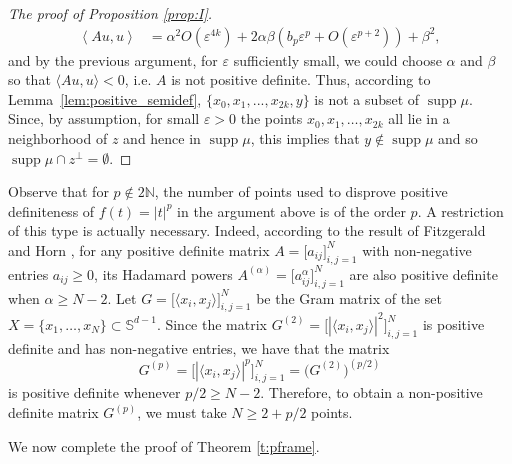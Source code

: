 \documentclass[11pt, leqno]{amsart}
\def\N{\mathbb N}
\theoremstyle{definition}
\numberwithin{equation}{section}
\begin{document}
\begin{proof}[The proof of Proposition \ref{prop:I}]
\begin{equation*}
\begin{aligned}
\left\langle   Au, u  \right\rangle & = \alpha^2 O(\varepsilon^{4k}) + 2 \alpha \beta \left( b_p \varepsilon^p + O( \varepsilon^{p + 2}) \right) + \beta^2,
\end{aligned}
\end{equation*}
and by the previous argument, for $\varepsilon$ sufficiently small, we could choose $\alpha$ and $\beta$ so that $\langle Au, u \rangle < 0$, i.e. $A$ is not positive definite. Thus, according to Lemma~\ref{lem:positive_semidef},  $\{ x_0, x_1, ..., x_{2k}, y \}$ is not a subset of $ \operatorname{supp} \mu$. Since, by assumption, for small $\varepsilon >0$  the points $x_0, x_1, \dots , x_{2k}$ all lie in a neighborhood of $z$ and hence in $\operatorname{supp} \mu$, this implies that $y \not\in \operatorname{supp} \mu $ and so  $\operatorname{supp} \mu  \cap  z^\perp  = \emptyset$. \end{proof}

Observe that for   $p\not\in 2 \N$, the number of points used to disprove positive definiteness of $f(t) = |t|^p$ in the  argument above is of the order $p$. A restriction of this type is actually  necessary.  Indeed, according to the result of Fitzgerald and Horn \cite{fitzgeraldFract1977}, for any positive definite matrix $A = \big[ a_{ij} \big]_{i,j=1}^N$ with non-negative entries $a_{ij} \ge 0$, its Hadamard powers $ A^{(\alpha)} =  \big[ a_{ij}^\alpha \big]_{i,j=1}^N$ are also positive definite when $\alpha \ge N-2 $. Let $G =  \big[ \langle x_i , x_j \rangle \big]_{i,j=1}^N$ be the Gram matrix of the set $X = \{ x_1,\dots, x_N \} \subset \mathbb S^{d-1}$. Since the matrix $G^{(2)} =  \big[ |\langle x_i , x_j \rangle|^2  \big]_{i,j=1}^N$ is positive definite and has non-negative entries, we have that the matrix $$ G^{(p)}  =  \big[ |\langle x_i , x_j \rangle|^p  \big]_{i,j=1}^N = \big( G^{(2)} \big)^{(p/2)} $$ is positive definite whenever $p/2 \ge N-2$. Therefore, to obtain a non-positive definite matrix  $G^{(p)}$, we must take $N \ge 2+ p/2$ points.  


We now complete the proof of Theorem \ref{t:pframe}.
\end{document}
